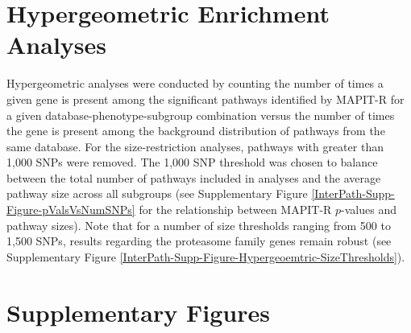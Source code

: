 \documentclass[10pt]{article}
\begin{document}
\section{Hypergeometric Enrichment Analyses}

Hypergeometric analyses were conducted by counting the number of times a given gene is present among the significant pathways identified by MAPIT-R for a given database-phenotype-subgroup combination versus the number of times the gene is present among the background distribution of pathways from the same database. For the size-restriction analyses, pathways with greater than 1,000 SNPs were removed. The 1,000 SNP threshold was chosen to balance between the total number of pathways included in analyses and the average pathway size across all subgroups (see Supplementary Figure \ref{InterPath-Supp-Figure-pValsVsNumSNPs} for the relationship between MAPIT-R $p$-values and pathway sizes). Note that for a number of size thresholds ranging from 500 to 1,500 SNPs, results regarding the proteasome family genes remain robust (see Supplementary Figure \ref{InterPath-Supp-Figure-Hypergeoemtric-SizeThresholds}).

\clearpage

\section{Supplementary Figures}\label{Supplementary-Figures}

\renewcommand{\figurename}{Supplementary Figure}
\renewcommand{\tablename}{Supplementary Table}
\setcounter{figure}{0}
\setcounter{table}{0}
\end{document}
